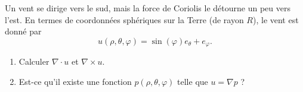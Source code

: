 
\begin{exercice}\label{exoOutilsMath-0083}

    Un vent se dirige vers le sud, mais la force de Coriolis le détourne un peu vers l'est. En termes de coordonnées sphériques sur la Terre (de rayon $R$), le vent est donné par
    \begin{equation}
        u(\rho,\theta,\varphi)=\sin(\varphi)e_{\theta}+e_{\varphi}.
    \end{equation}
    \begin{enumerate}
        \item
            Calculer $\nabla\cdot u$ et $\nabla\times u$.
        \item
            Est-ce qu'il existe une fonction $p(\rho,\theta,\varphi)$ telle que $u=\nabla p$ ?
    \end{enumerate}

\end{exercice}
